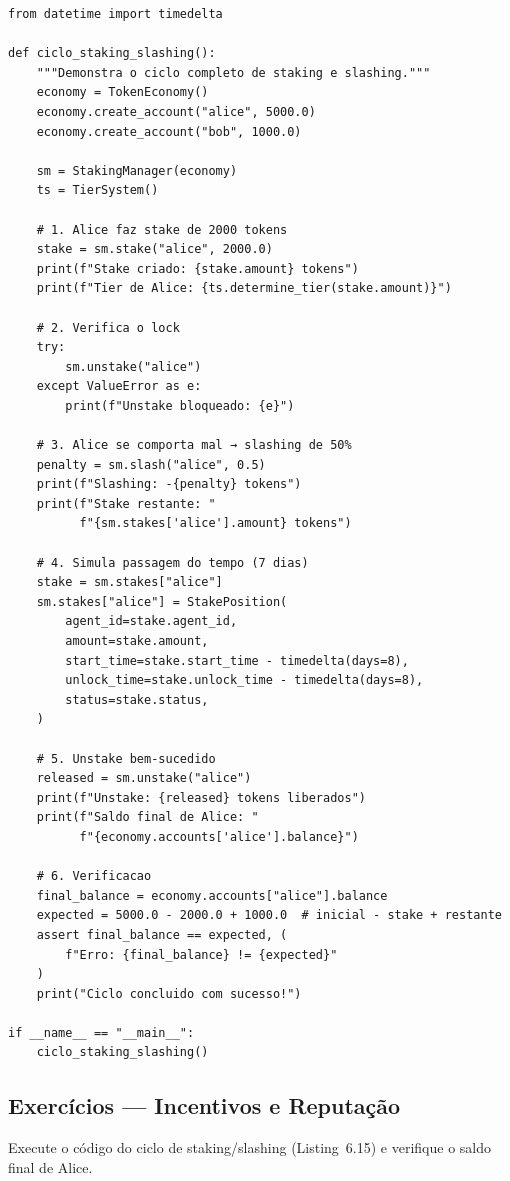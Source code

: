 \begin{lstlisting}[caption={Ciclo completo de staking e slashing},
                  label={lst:ciclo-staking-slashing}]
from datetime import timedelta

def ciclo_staking_slashing():
    """Demonstra o ciclo completo de staking e slashing."""
    economy = TokenEconomy()
    economy.create_account("alice", 5000.0)
    economy.create_account("bob", 1000.0)

    sm = StakingManager(economy)
    ts = TierSystem()

    # 1. Alice faz stake de 2000 tokens
    stake = sm.stake("alice", 2000.0)
    print(f"Stake criado: {stake.amount} tokens")
    print(f"Tier de Alice: {ts.determine_tier(stake.amount)}")

    # 2. Verifica o lock
    try:
        sm.unstake("alice")
    except ValueError as e:
        print(f"Unstake bloqueado: {e}")

    # 3. Alice se comporta mal → slashing de 50%
    penalty = sm.slash("alice", 0.5)
    print(f"Slashing: -{penalty} tokens")
    print(f"Stake restante: "
          f"{sm.stakes['alice'].amount} tokens")

    # 4. Simula passagem do tempo (7 dias)
    stake = sm.stakes["alice"]
    sm.stakes["alice"] = StakePosition(
        agent_id=stake.agent_id,
        amount=stake.amount,
        start_time=stake.start_time - timedelta(days=8),
        unlock_time=stake.unlock_time - timedelta(days=8),
        status=stake.status,
    )

    # 5. Unstake bem-sucedido
    released = sm.unstake("alice")
    print(f"Unstake: {released} tokens liberados")
    print(f"Saldo final de Alice: "
          f"{economy.accounts['alice'].balance}")

    # 6. Verificacao
    final_balance = economy.accounts["alice"].balance
    expected = 5000.0 - 2000.0 + 1000.0  # inicial - stake + restante
    assert final_balance == expected, (
        f"Erro: {final_balance} != {expected}"
    )
    print("Ciclo concluido com sucesso!")

if __name__ == "__main__":
    ciclo_staking_slashing()
\end{lstlisting}

\subsection{Exercícios — Incentivos e Reputação}

\begin{exercicio}
Execute o código do ciclo de staking/slashing (Listing~6.15)
e verifique o saldo final de Alice.
\end{exercicio}

